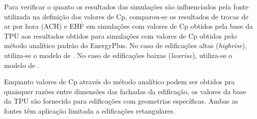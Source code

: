 \documentclass[brazil,hardcopy,openany,a5paper]{ufscthesis}
\begin{document}
%		
%		
%		
		
		Para verificar o quanto os resultados das simulações são influenciados pela fonte utilizada na definição dos valores de Cp, comparou-se os resultados de trocas de ar por hora (ACH) e EHF em simulações com valores de Cp obtidos pela base da TPU aos resultados obtidos para simulações com valores de Cp obtidos pelo método analítico padrão do EnergyPlus.
		No caso de edificações altas (\textit{highrise}), utiliza-se o modelo de  \cite{Atkins}. No caso de edificações baixas (\textit{lowrise}), utiliza-se o modelo de  \cite{SwamiChandra}.
		
		Enquanto valores de Cp através do método analítico podem ser obtidos pra quaisquer razões entre dimensões das fachadas da edificação, os valores da base da TPU são fornecido para edificações com geometrias específicas. Ambas as fontes têm aplicação limitada a edificações retangulares.
		
\end{document}
